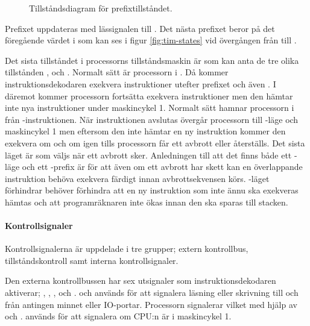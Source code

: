 \documentclass[main.tex]{subfiles}
\begin{document}
\begin{figure}
    \center
    
    \caption{Tillståndsdiagram för prefixtillståndet.}
    \label{fig:prefix}
\end{figure}

Prefixet uppdateras med lässignalen till . Det nästa prefixet beror på
det föregående värdet i  som kan ses i figur \ref{fig:tim-states} vid
övergången från  till .

Det sista tillståndet i processorns tillståndsmaskin är  som kan
anta de tre olika tillstånden ,  och .
Normalt sätt är processorn i . Då kommer instruktionsdekodaren
exekvera instruktioner utefter  prefixet och även . I
 däremot kommer processorn fortsätta exekvera instruktioner men den
hämtar inte nya instruktioner under maskincykel 1. Normalt sätt hamnar
processorn i  från -instruktionen. När 
instruktionen avslutas övergår processorn till -läge och
maskincykel 1 men eftersom den inte hämtar en ny instruktion kommer den
exekvera  om och om igen tills processorn får ett avbrott eller
återställs. Det sista läget är  som väljs när ett avbrott
sker. Anledningen till att det finns både ett -läge och ett
-prefix är för att även om ett avbrott har skett kan en överlappande
instruktion behöva exekvera färdigt innan avbrottsekvensen körs.
-läget förhindrar behöver förhindra att en ny instruktion som
inte ännu ska exekveras hämtas och att programräknaren inte ökas innan den ska
sparas till stacken.

\paragraph{Kontrollsignaler}
Kontrollsignalerna är uppdelade i tre grupper; extern kontrollbus,
tillståndskontroll samt interna kontrollsignaler.

Den externa kontrollbussen har sex utsignaler som instruktionsdekodaren
aktiverar; , , ,  och .
 och  används för att signalera läsning eller skrivning till
och från antingen minnet eller IO-portar. Processorn signalerar vilket med
hjälp av  och .  används för att signalera om
CPU:n är i maskincykel 1.
\end{document}
